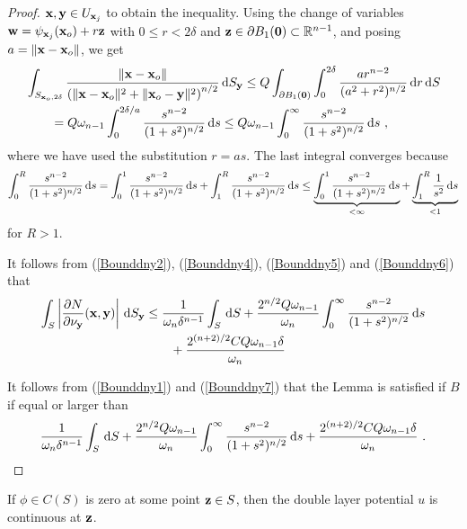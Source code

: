 \begin{proof}
$\displaystyle \mathbf{x},\mathbf{y} \in U_{\mathbf{x}_j}$ to obtain the
inequality.  Using the change of variables
$\mathbf{w} = \psi_{\mathbf{x}_j}(\mathbf{x}_o) + r \mathbf{z}$ with $0 \leq r < 2\delta$
and $\mathbf{z} \in \partial B_1(\mathbf{0}) \subset \mathbb{R}^{n-1}$, and posing
$a = \|\mathbf{x}-\mathbf{x}_o\|$, we get
\begin{align}
&\int_{S_{\mathbf{x}_o,2\delta}}
\frac{\left\|\mathbf{x}-\mathbf{x}_o\right\|}
{\left(\|\mathbf{x}-\mathbf{x}_o\|^2 + \|\mathbf{x}_o-\mathbf{y}\|^2\right)^{n/2}}
\,\mathrm{d}{S}_{\mathbf{y}}
\leq Q \int_{\partial B_1(\mathbf{0})} \int_0^{2\delta}
\frac{a r^{n-2}}{(a^2 + r^2)^{n/2}} \,\mathrm{d}{r} \,\mathrm{d}{S} \nonumber \\
&\qquad
= Q \omega_{n-1} \int_0^{2\delta/a} \frac{s^{n-2}}{(1 + s^2)^{n/2}} \,\mathrm{d}{s} 
\leq Q \omega_{n-1} \int_0^{\infty} \frac{s^{n-2}}{(1 + s^2)^{n/2}} \,\mathrm{d}{s} \ ,
\label{Bounddny6}
\end{align}
where we have used the substitution $r = a s$.
The last integral converges because
\[
\int_0^R \frac{s^{n-2}}{(1 + s^2)^{n/2}} \,\mathrm{d}{s}
= \int_0^1 \frac{s^{n-2}}{(1 + s^2)^{n/2}} \,\mathrm{d}{s}
+ \int_1^R \frac{s^{n-2}}{(1 + s^2)^{n/2}} \,\mathrm{d}{s}
\leq \underbrace{\int_0^1 \frac{s^{n-2}}{(1 + s^2)^{n/2}} \,\mathrm{d}{s}}_{<\infty}
+ \underbrace{\int_1^R \frac{1}{s^2} \,\mathrm{d}{s}}_{<1}
\]
for $R >1$.

It follows from (\ref{Bounddny2}), (\ref{Bounddny4}),
(\ref{Bounddny5}) and (\ref{Bounddny6}) that
\begin{equation} \label{Bounddny7}
\begin{split}
\int_S
\left| \frac{\partial{N}}{\partial \mathbf{\nu}_{\mathbf{y}}}(\mathbf{x},\mathbf{y}) \right| \,\mathrm{d}{S}_{\mathbf{y}}
&\leq \frac{1}{\omega_n \delta^{n-1}} \int_S \,\mathrm{d}{S} 
+ \frac{2^{n/2}Q \omega_{n-1}}{\omega_n} 
\int_0^{\infty} \frac{s^{n-2}}{(1 + s^2)^{n/2}} \,\mathrm{d}{s} \\
&\qquad + \frac{2^{(n+2)/2} C Q \omega_{n-1} \delta}{\omega_n}
\end{split}
\end{equation}

 It follows from (\ref{Bounddny1}) and (\ref{Bounddny7})
that the Lemma is satisfied if $B$ if equal or larger than
\[
\frac{1}{\omega_n \delta^{n-1}} \int_S \,\mathrm{d}{S} 
+ \frac{2^{n/2}Q \omega_{n-1}}{\omega_n} 
\int_0^{\infty} \frac{s^{n-2}}{(1 + s^2)^{n/2}} \,\mathrm{d}{s}
+ \frac{2^{(n+2)/2} C Q \omega_{n-1} \delta}{\omega_n} \ . \qedhere
\]
\end{proof}

\begin{lemma} \label{pot_lem_dbl5}
If $\phi \in C(S)$ is zero at some point $\mathbf{z} \in S$, then the
double layer potential $u$ is continuous at $\mathbf{z}$.
\end{lemma}

